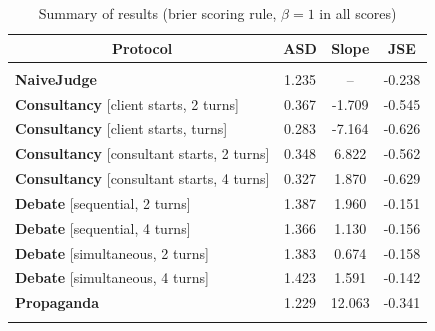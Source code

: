 \begin{table}[t]
\caption{Summary of results (brier scoring rule, $\beta=1$ in all scores)}
\label{solib:tab:protocol-comparison}
\begin{center}
\begin{tabular}{lccc}
\multicolumn{1}{c}{\bf Protocol} & \multicolumn{1}{c}{\bf ASD} & \multicolumn{1}{c}{\bf Slope} & \multicolumn{1}{c}{\bf JSE} \\
\hline \\
\textbf{NaiveJudge} & 1.235 & -- & -0.238 \\
\textbf{Consultancy} [client starts, 2 turns] & 0.367 & -1.709 & -0.545 \\
\textbf{Consultancy} [client starts, turns] & 0.283 & -7.164 & -0.626 \\
\textbf{Consultancy} [consultant starts, 2 turns] & 0.348 & 6.822 & -0.562 \\
\textbf{Consultancy} [consultant starts, 4 turns] & 0.327 & 1.870 & -0.629 \\
\textbf{Debate} [sequential, 2 turns] & 1.387 & 1.960 & -0.151 \\
\textbf{Debate} [sequential, 4 turns] & 1.366 & 1.130 & -0.156 \\
\textbf{Debate} [simultaneous, 2 turns] & 1.383 & 0.674 & -0.158 \\
\textbf{Debate} [simultaneous, 4 turns] & 1.423 & 1.591 & -0.142 \\
\textbf{Propaganda} & 1.229 & 12.063 & -0.341 \\
\\
\end{tabular}
\end{center}
\label{solib:tab:results}
\end{table}